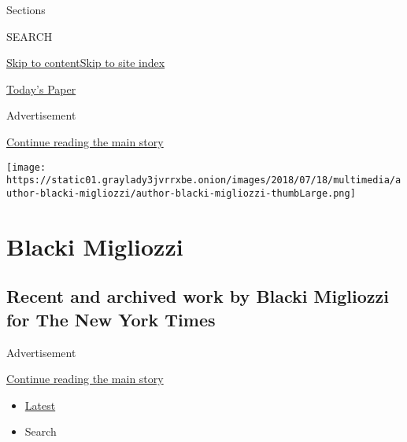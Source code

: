 Sections

SEARCH

\protect\hyperlink{site-content}{Skip to
content}\protect\hyperlink{site-index}{Skip to site index}

\href{https://myaccount.nytimes3xbfgragh.onion/auth/login?response_type=cookie\&client_id=vi}{}

\href{https://www.nytimes3xbfgragh.onion/section/todayspaper}{Today's
Paper}

Advertisement

\protect\hyperlink{after-top}{Continue reading the main story}

\texttt{[image: https://static01.graylady3jvrrxbe.onion/images/2018/07/18/multimedia/author-blacki-migliozzi/author-blacki-migliozzi-thumbLarge.png]}

\hypertarget{blacki-migliozzi}{%
\section{Blacki Migliozzi}\label{blacki-migliozzi}}

\hypertarget{recent-and-archived-work-by-blacki-migliozzi-for-the-new-york-times}{%
\subsection{Recent and archived work by Blacki Migliozzi for The New
York
Times}\label{recent-and-archived-work-by-blacki-migliozzi-for-the-new-york-times}}

Advertisement

\protect\hyperlink{after-mid1}{Continue reading the main story}

\begin{itemize}
\tightlist
\item
  \protect\hyperlink{stream-panel}{Latest}
\item
  Search
\end{itemize}

